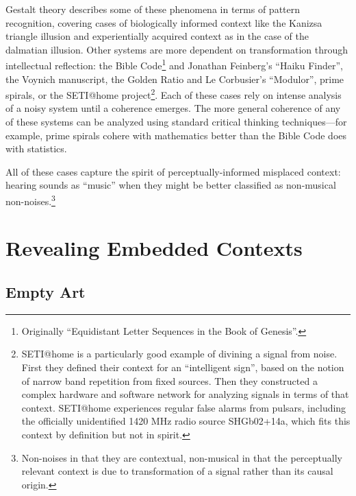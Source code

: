 \documentclass{thesis}
\begin{document}
Gestalt theory describes some of these phenomena in terms of pattern recognition, covering cases of biologically informed context like the Kanizsa triangle illusion\cite{alexander_bogomolny_kanizsa_????} and experientially acquired context as in the case of the dalmatian illusion\cite{michael_bach_dalmatian_2002}. Other systems are more dependent on transformation through intellectual reflection: the Bible Code\footnote{Originally ``Equidistant Letter Sequences in the Book of Genesis''\cite{rips_equidistant_1994}.} and Jonathan Feinberg's ``Haiku Finder'', the Voynich manuscript\cite{robin_mckie_secret_2004}, the Golden Ratio\cite{Doczi81}\cite{markowsky_misconceptions_1992} and Le Corbusier's ``Modulor''\cite{padovan_proportion_1999}, prime spirals\cite{michael_m._ross_natural_2007}\cite{weisstein_prime_????}, or the SETI@home project\cite{seti_about_????}\footnote{SETI@home is a particularly good example of divining a signal from noise. First they defined their context for an ``intelligent sign'', based on the notion of narrow band repetition from fixed sources. Then they constructed a complex hardware and software network for analyzing signals in terms of that context. SETI@home experiences regular false alarms from pulsars, including the officially unidentified 1420 MHz radio source SHGb02+14a\cite{eugenie_samuel_reich_mysterious_2004}, which fits this context by definition but not in spirit.}. Each of these cases rely on intense analysis of a noisy system until a coherence emerges. The more general coherence of any of these systems can be analyzed using standard critical thinking techniques\cite{Moore07}---for example, prime spirals cohere with mathematics better than the Bible Code does with statistics.

All of these cases capture the spirit of perceptually-informed misplaced context: hearing sounds as ``music'' when they might be better classified as non-musical non-noises.\footnote{Non-noises in that they are contextual, non-musical in that the perceptually relevant context is due to transformation of a signal rather than its causal origin.}

\chapter{Revealing Embedded Contexts}

\section{Empty Art}
\end{document}
